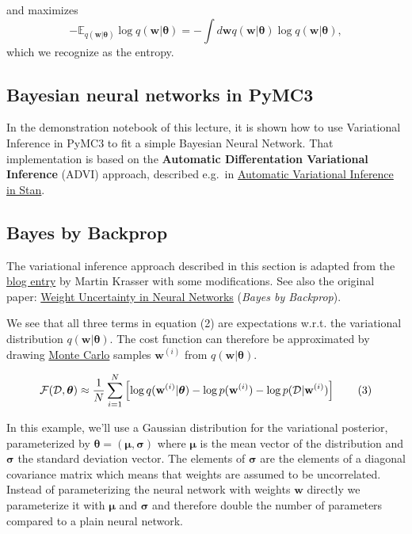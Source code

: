 \documentclass[%
oneside,                 %
final,                   %
10pt]{article}
\begin{document}
and maximizes
\[ - \mathbb{E}_{q(\mathbf{w} \lvert \boldsymbol{\theta})} \log q(\mathbf{w} \lvert \boldsymbol{\theta}) = -\int d \mathbf{w} q(\mathbf{w} \lvert \boldsymbol{\theta}) \log q(\mathbf{w} \lvert \boldsymbol{\theta}), \]
which we recognize as the entropy.

\subsection{Bayesian neural networks in PyMC3}
In the demonstration notebook of this lecture, it is shown how to use Variational Inference in PyMC3 to fit a simple Bayesian Neural Network. That implementation is based on the \textbf{Automatic Differentation Variational Inference} (ADVI) approach, described e.g.~in \href{{https://arxiv.org/abs/1506.03431}}{Automatic Variational Inference in Stan}.

\subsection{Bayes by Backprop}

The variational inference approach described in this section is adapted from the \href{{http://krasserm.github.io/2019/03/14/bayesian-neural-networks/}}{blog entry} by Martin Krasser with some modifications. See also the original paper: \href{{https://arxiv.org/abs/1505.05424}}{Weight Uncertainty in Neural Networks} (\emph{Bayes by Backprop}).

We see that all three terms in equation (2) are expectations w.r.t. the variational distribution $q(\mathbf{w} \lvert \boldsymbol{\theta})$. The cost function can therefore be approximated by drawing \href{{https://en.wikipedia.org/wiki/Monte_Carlo_method}}{Monte Carlo} samples $\mathbf{w}^{(i)}$ from $q(\mathbf{w} \lvert \boldsymbol{\theta})$.

\[ \mathcal{F}(\mathcal{D},\boldsymbol{\theta}) \approx {1 \over N} \sum_{i=1}^N \left[
\log q(\mathbf{w}^{(i)} \lvert \boldsymbol{\theta}) -
\log p(\mathbf{w}^{(i)}) -
\log p(\mathcal{D} \lvert \mathbf{w}^{(i)})\right]
\tag{3} \]

In this example, we'll use a Gaussian distribution for the variational posterior, parameterized by $\boldsymbol{\theta} = (\boldsymbol{\mu}, \boldsymbol{\sigma})$ where $\boldsymbol{\mu}$ is the mean vector of the distribution and $\boldsymbol{\sigma}$ the standard deviation vector. The elements of $\boldsymbol{\sigma}$ are the elements of a diagonal covariance matrix which means that weights are assumed to be uncorrelated. Instead of parameterizing the neural network with weights $\mathbf{w}$ directly we parameterize it with $\boldsymbol{\mu}$ and $\boldsymbol{\sigma}$ and therefore double the number of parameters compared to a plain neural network.
\end{document}
